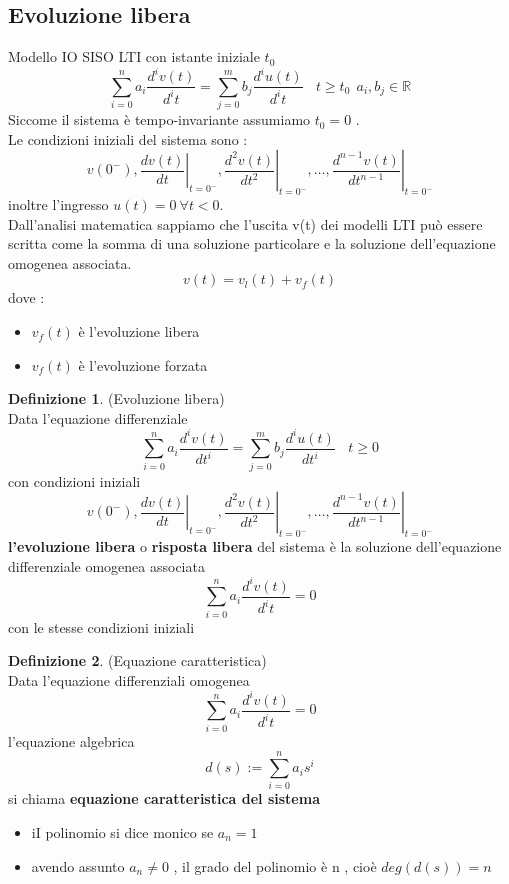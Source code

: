 \documentclass{article}
\theoremstyle{definition}
\newtheorem*{definizione}{Definizione}
\newcommand{\R}{\mathbb{R}}
\begin{document}
\subsection{Evoluzione libera}
Modello IO SISO LTI con istante iniziale $t_0$
$$\sum_{i=0}^{n}a_i \frac{d^i v(t)}{d^it}=\sum_{j=0}^{m}b_j \frac{d^i u(t)}{d^it}  \ \ \ \ t \geq t_0\ \ a_i,b_j \in \R	$$
Siccome il sistema è tempo-invariante assumiamo $t_0=0$ .\\Le condizioni iniziali del sistema sono : 
$$v\left(0^{-}\right),\left.\frac{d v(t)}{d t}\right|_{t=0^{-}},\left.\frac{d^2 v(t)}{d t^2}\right|_{t=0^{-}}, \ldots,\left.\frac{d^{n-1} v(t)}{d t^{n-1}}\right|_{t=0^{-}}
$$
inoltre l'ingresso $u(t)=0 \ \forall t < 0$.\\Dall'analisi matematica sappiamo che l'uscita v(t) dei modelli LTI può essere scritta come la somma di una soluzione particolare e la soluzione dell'equazione omogenea associata.
$$v(t)=v_l(t)+v_f(t)$$
dove : 
\begin{itemize}
	\item $v_f(t)$ è l'evoluzione libera 
	\item $v_f(t)$ è l'evoluzione forzata 
\end{itemize}
\begin{definizione}(Evoluzione libera)\\
	Data l'equazione differenziale
	$$\sum_{i=0}^{n}a_i \frac{d^i v(t)}{dt^i}=\sum_{j=0}^{m}b_j \frac{d^i u(t)}{dt^i}  \ \ \ \ t \geq 0$$ con condizioni iniziali $$v\left(0^{-}\right),\left.\frac{d v(t)}{d t}\right|_{t=0^{-}},\left.\frac{d^2 v(t)}{d t^2}\right|_{t=0^{-}}, \ldots,\left.\frac{d^{n-1} v(t)}{d t^{n-1}}\right|_{t=0^{-}}
	$$ \textbf{l'evoluzione libera } o \textbf{risposta libera} del sistema è la soluzione dell'equazione differenziale omogenea associata 
	$$\sum_{i=0}^{n}a_i \frac{d^i v(t)}{d^it}=0$$ con le stesse condizioni iniziali
\end{definizione}
\begin{definizione}(Equazione caratteristica)\\
	Data l'equazione differenziali omogenea
	$$\sum_{i=0}^{n}a_i \frac{d^i v(t)}{d^it}=0$$
	l'equazione algebrica 
	$$d(s):= \sum_{i=0}^{n}a_i s^i$$
	si chiama \textbf{equazione caratteristica del sistema }
	\begin{itemize}
		\item iI polinomio si dice monico se $a_n=1$
		\item avendo assunto $a_n \neq 0$ , il grado del polinomio è n , cioè $deg(d(s))=n$
	\end{itemize}
\end{definizione}
\end{document}
